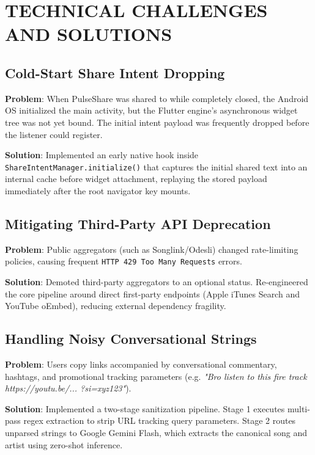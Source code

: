 \documentclass[12pt,a4paper]{report}
\begin{document}
\chapter{TECHNICAL CHALLENGES AND SOLUTIONS}

\section{Cold-Start Share Intent Dropping}
\noindent \textbf{Problem}: When PulseShare was shared to while completely closed, the Android OS initialized the main activity, but the Flutter engine's asynchronous widget tree was not yet bound. The initial intent payload was frequently dropped before the listener could register.

\noindent \textbf{Solution}: Implemented an early native hook inside \texttt{ShareIntentManager.initialize()} that captures the initial shared text into an internal cache before widget attachment, replaying the stored payload immediately after the root navigator key mounts.

\section{Mitigating Third-Party API Deprecation}
\noindent \textbf{Problem}: Public aggregators (such as Songlink/Odesli) changed rate-limiting policies, causing frequent \texttt{HTTP 429 Too Many Requests} errors.

\noindent \textbf{Solution}: Demoted third-party aggregators to an optional status. Re-engineered the core pipeline around direct first-party endpoints (Apple iTunes Search and YouTube oEmbed), reducing external dependency fragility.

\section{Handling Noisy Conversational Strings}
\noindent \textbf{Problem}: Users copy links accompanied by conversational commentary, hashtags, and promotional tracking parameters (e.g. \textit{"Bro listen to this fire track https://youtu.be/... ?si=xyz123"}).

\noindent \textbf{Solution}: Implemented a two-stage sanitization pipeline. Stage 1 executes multi-pass regex extraction to strip URL tracking query parameters. Stage 2 routes unparsed strings to Google Gemini Flash, which extracts the canonical song and artist using zero-shot inference.
\end{document}
